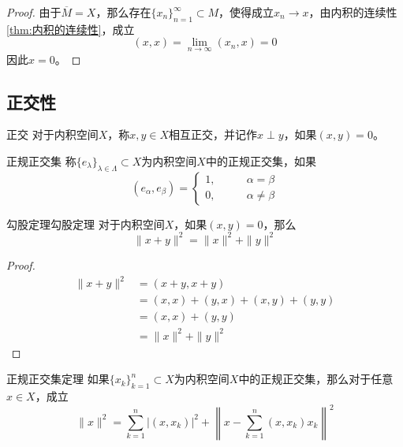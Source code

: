 \documentclass[lang = cn, scheme = chinese, thmcnt = section]{elegantbook}
\newcommand{\sub}{\subset}             %
\begin{document}
\begin{proof}
	由于$\overline{M}=X$，那么存在$\{x_n\}_{n=1}^{\infty}\sub M$，使得成立$x_n\to x$，由内积的连续性\ref{thm:内积的连续性}，成立
	$$
	(x,x)=\lim_{n\to\infty}(x_n,x)=0
	$$
	因此$x=0$。
\end{proof}

\subsection{正交性}

\begin{definition}{正交}
	对于内积空间$X$，称$x,y\in X$相互正交，并记作$x\perp y$，如果$(x,y)=0$。
\end{definition}

\begin{definition}{正规正交集}
	称$\{ e_\lambda \}_{\lambda\in\Lambda}\sub X$为内积空间$X$中的正规正交集，如果
	$$
	(e_\alpha,e_\beta)=\begin{cases}
		1,\qquad & \alpha=\beta\\
		0,\qquad & \alpha\ne\beta
	\end{cases}
	$$
\end{definition}

\begin{theorem}{勾股定理}{勾股定理}
	对于内积空间$X$，如果$(x,y)=0$，那么
	$$
	\|x+y\|^2=\|x\|^2+\|y\|^2
	$$
\end{theorem}

\begin{proof}
	\begin{align*}
		\|x+y\|^2
		& = (x+y,x+y)\\
		& = (x,x)+(y,x)+(x,y)+(y,y)\\
		& = (x,x)+(y,y)\\
		& = \|x\|^2+\|y\|^2
	\end{align*}
\end{proof}

\begin{theorem}{}{正规正交集定理}
	如果$\{x_k\}_{k=1}^n\sub X$为内积空间$X$中的正规正交集，那么对于任意$x\in X$，成立
	$$
	\| x \|^2=\sum_{k=1}^{n}|(x,x_k)|^2+\left\| x-\sum_{k=1}^{n}(x,x_k)x_k \right\|^2
	$$
\end{theorem}
\end{document}
